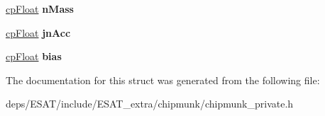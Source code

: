 \begin{DoxyCompactItemize}
\item 
\mbox{\label{structcp_slide_joint_afc1d5423a8637a8b101e713d91b218e3}} 
\mbox{\hyperlink{group__basic_types_gac1ed65573e035bf892505768c852d8d3}{cp\+Float}} {\bfseries n\+Mass}
\item 
\mbox{\label{structcp_slide_joint_a2722beb353431b561c8fa9431750cc4e}} 
\mbox{\hyperlink{group__basic_types_gac1ed65573e035bf892505768c852d8d3}{cp\+Float}} {\bfseries jn\+Acc}
\item 
\mbox{\label{structcp_slide_joint_a799773608a020dcd87eb6b00d7058a00}} 
\mbox{\hyperlink{group__basic_types_gac1ed65573e035bf892505768c852d8d3}{cp\+Float}} {\bfseries bias}
\end{DoxyCompactItemize}


The documentation for this struct was generated from the following file\+:\begin{DoxyCompactItemize}
\item 
deps/\+E\+S\+A\+T/include/\+E\+S\+A\+T\+\_\+extra/chipmunk/chipmunk\+\_\+private.\+h\end{DoxyCompactItemize}
